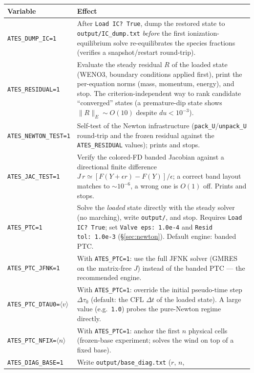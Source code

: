 \documentclass[english,a4paper]{kiseon_memo}
\begin{document}
\begin{table}[htbp]\centering\small
\begin{tabular}{@{}lp{10.2cm}@{}}
\toprule
Variable & Effect \\
\midrule
\texttt{ATES\_DUMP\_IC=1} & After \texttt{Load IC?\ True}, dump the restored
  state to \texttt{output/IC\_dump.txt} \emph{before} the first
  ionization-equilibrium solve re-equilibrates the species fractions
  (verifies a snapshot/restart round-trip). \\
\texttt{ATES\_RESIDUAL=1} & Evaluate the steady residual $R$ of the loaded
  state (WENO3, boundary conditions applied first), print the per-equation
  norms (mass, momentum, energy), and stop. The criterion-independent way to
  rank candidate ``converged'' states (a premature-dip state shows
  $\|R\|_E\sim O(10)$ despite $du<10^{-3}$). \\
\texttt{ATES\_NEWTON\_TEST=1} & Self-test of the Newton infrastructure
  (\texttt{pack\_U}/\texttt{unpack\_U} round-trip and the frozen residual
  against the \texttt{ATES\_RESIDUAL} values); prints and stops. \\
\texttt{ATES\_JAC\_TEST=1} & Verify the colored-FD banded Jacobian against a
  directional finite difference $J\,r\simeq[F(Y+\epsilon r)-F(Y)]/\epsilon$;
  a correct band layout matches to $\sim10^{-6}$, a wrong one is $O(1)$ off.
  Prints and stops. \\
\midrule
\texttt{ATES\_PTC=1} & Solve the \emph{loaded} state directly with the steady
  solver (no marching), write \texttt{output/}, and stop. Requires
  \texttt{Load IC?\ True}; set \texttt{Valve eps:\ 1.0e-4} and
  \texttt{Resid tol:\ 1.0e-3} (\S\ref{sec:newton}). Default engine: banded
  PTC. \\
\texttt{ATES\_PTC\_JFNK=1} & With \texttt{ATES\_PTC=1}: use the full JFNK
  solver (GMRES on the matrix-free $J$) instead of the banded PTC ---
  the recommended engine. \\
\texttt{ATES\_PTC\_DTAU0=}$\langle v\rangle$ & With \texttt{ATES\_PTC=1}:
  override the initial pseudo-time step $\Delta\tau_0$ (default: the CFL
  $\Delta t$ of the loaded state). A large value (e.g.\ \texttt{1.0}) probes
  the pure-Newton regime directly. \\
\texttt{ATES\_PTC\_NFIX=}$\langle n\rangle$ & With \texttt{ATES\_PTC=1}:
  anchor the first $n$ physical cells (frozen-base experiment; solves the
  wind on top of a fixed base). \\
\midrule
\texttt{ATES\_DIAG\_BASE=1} & Write \texttt{output/base\_diag.txt} ($r$, $n$,

\end{tabular}
\end{table}
\end{document}
